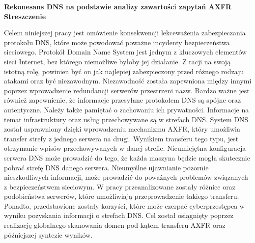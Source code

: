 \afterpage{\blankpage}
\begin{center}
	\fontsize{18pt}{12pt}\selectfont\textbf{Rekonesans DNS na podstawie analizy zawartości zapytań AXFR}\\
	\vspace{1cm}
	\fontsize{15pt}{12pt}\selectfont
	\textbf{Streszczenie}
\end{center}
Celem niniejszej pracy jest omówienie konsekwencji lekceważenia zabezpieczania protokołu DNS, które może powodować poważne incydenty
bezpieczeństwa sieciowego.
Protokół Domain Name System jest jednym z kluczowych elementów sieci Internet, bez którego niemożliwe byłoby jej działanie.
Z racji na swoją istotną rolę, powinien być on jak najlepiej zabezpieczony przed różnego rodzaju atakami oraz być niezawodnym.
Niezawodność została zapewniona między innymi poprzez wprowadzenie redundancji serwerów przestrzeni nazw. Bardzo ważne jest również zapewnienie, że informacje przesyłane
protokołem DNS są spójne oraz autentyczne. Należy także pamiętać o zachowaniu ich prywatności. Informacje na temat infrastruktury
oraz usług przechowywane są w strefach DNS. System DNS został usprawniony dzięki wprowadzeniu mechanizmu AXFR, który umożliwia
transfer strefy z jednego serwera na drugi. Wynikiem transferu tego typu, jest otrzymanie wpisów przechowywanych w danej strefie.
Nieumiejętna konfiguracja serwera DNS może prowadzić do tego, że każda maszyna będzie mogła skutecznie pobrać strefę DNS danego
serwera.
Nieumyślne ujawnianie pozornie nieszkodliwych informacji, może prowadzić do poważnych problemów związanych z bezpieczeństwem sieciowym.
W pracy przeanalizowane zostały różnice oraz podobieństwa serwerów, które umożliwiają przeprowadzenie takiego transferu. Ponadto,
przedstawione zostały korzyści, które może czerpać cyberprzestępca w wyniku pozyskania informacji o strefach DNS.
Cel został osiągnięty poprzez realizację globalnego skanowania domen pod kątem transferu AXFR oraz późniejszej syntezie wyników.\\
\vspace{1cm}


